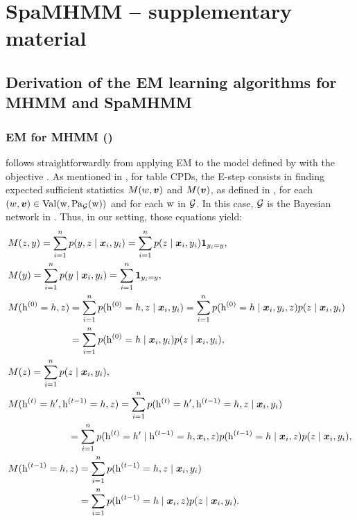 
\chapter{SpaMHMM -- supplementary material} %

\label{appendix:spamhmm} %

\section{Derivation of the EM learning algorithms for MHMM and SpaMHMM}

\subsection{EM for MHMM ()}
\label{sec:proof_em_noreg}
 follows straightforwardly from applying EM to the model defined by  with the objective . As mentioned in , for table CPDs, the E-step consists in finding expected sufficient statistics $M(w,{\bm{v}})$ and $M({\bm{v}})$, as defined in , for each $(w,{\bm{v}}) \in \mathrm{Val}({\textnormal{w}},\mathrm{Pa}_{\mathcal{G}}({\textnormal{w}}))$ and for each ${\textnormal{w}}$ in ${\mathcal{G}}$. In this case, ${\mathcal{G}}$ is the Bayesian network in . Thus, in our setting, those equations yield:
\begingroup
\allowdisplaybreaks
\begin{align}
	&M(z,y) = \sum_{i=1}^{n} p(y, z \mid \vx_i, y_i) = \sum_{i=1}^{n} p(z \mid \vx_i, y_i) \1_{y_i=y}, \\
	&M(y) = \sum_{i=1}^{n} p(y \mid \vx_i, y_i) = \sum_{i=1}^{n} \1_{y_i=y}, \\
	&M(\rh^{(0)}=h, z) = \sum_{i=1}^{n} p(\rh^{(0)}=h, z \mid \vx_i, y_i) = \sum_{i=1}^{n} p(\rh^{(0)}=h \mid \vx_i, y_i, z) p(z \mid \vx_i, y_i) \nonumber\\
	&\hphantom{M(\rh^{(0)}=h,z)} = \sum_{i=1}^{n} p(\rh^{(0)}=h \mid \vx_i, y_i) p(z \mid \vx_i, y_i), \\
	&M(z) = \sum_{i=1}^{n} p(z \mid \vx_i, y_i), \\
	&M(\rh^{(t)}=h', \rh^{(t-1)}=h, z) = \sum_{i=1}^{n} p(\rh^{(t)}=h', \rh^{(t-1)}=h, z \mid \vx_i, y_i) \nonumber\\
	&\hphantom{M(\rh^{(t-1)}=h, } = \sum_{i=1}^{n} p(\rh^{(t)}=h' \mid \rh^{(t-1)}=h, \vx_i, z) p(\rh^{(t-1)}=h \mid \vx_i, z) p(z \mid \vx_i, y_i), \\
	&M(\rh^{(t-1)}=h, z) = \sum_{i=1}^{n} p(\rh^{(t-1)}=h, z \mid \vx_i, y_i) \nonumber\\
	&\hphantom{M(\rh^{(t-1)}=h, z)} = \sum_{i=1}^{n} p(\rh^{(t-1)}=h \mid \vx_i, z) p(z \mid \vx_i, y_i).
\end{align}
